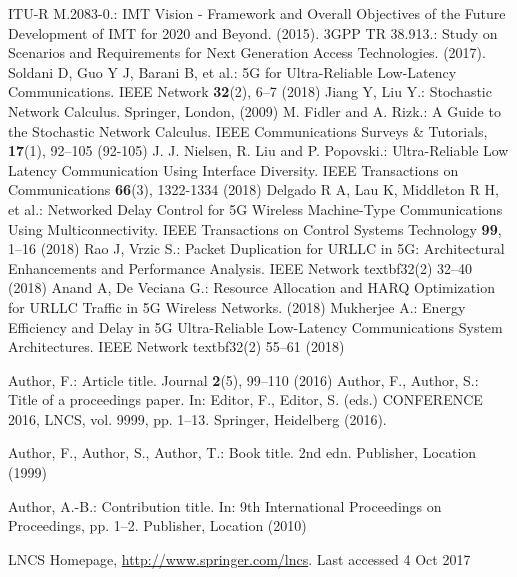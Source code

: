 \documentclass[runningheads]{llncs}
\begin{document}
\begin{thebibliography}{8}
ITU-R M.2083-0.: IMT Vision - Framework and Overall Objectives of the Future Development of IMT for 2020 and Beyond. (2015).
 3GPP TR 38.913.: Study on Scenarios and Requirements for Next Generation Access Technologies. (2017).
Soldani D, Guo Y J, Barani B, et al.: 5G for Ultra-Reliable Low-Latency Communications. IEEE Network \textbf{32}(2), 6--7 (2018)
Jiang Y, Liu Y.: Stochastic Network Calculus. Springer, London, (2009)
M. Fidler and A. Rizk.: A Guide to the Stochastic Network Calculus. IEEE Communications Surveys \& Tutorials, \textbf{17}(1), 92--105 (92-105)
J. J. Nielsen, R. Liu and P. Popovski.: Ultra-Reliable Low Latency Communication Using Interface Diversity. IEEE Transactions on Communications \textbf{66}(3), 1322-1334 (2018)
Delgado R A, Lau K, Middleton R H, et al.: Networked Delay Control for 5G Wireless Machine-Type Communications Using Multiconnectivity. IEEE Transactions on Control Systems Technology \textbf{99}, 1--16 (2018)
Rao J, Vrzic S.: Packet Duplication for URLLC in 5G: Architectural Enhancements and Performance Analysis. IEEE Network textbf{32}(2) 32--40 (2018)
Anand A, De Veciana G.: Resource Allocation and HARQ Optimization for URLLC Traffic in 5G Wireless Networks. (2018)
Mukherjee A.: Energy Efficiency and Delay in 5G Ultra-Reliable Low-Latency Communications System Architectures. IEEE Network textbf{32}(2) 55--61 (2018)


Author, F.: Article title. Journal \textbf{2}(5), 99--110 (2016)
Author, F., Author, S.: Title of a proceedings paper. In: Editor,
F., Editor, S. (eds.) CONFERENCE 2016, LNCS, vol. 9999, pp. 1--13.
Springer, Heidelberg (2016). 

Author, F., Author, S., Author, T.: Book title. 2nd edn. Publisher,
Location (1999)

Author, A.-B.: Contribution title. In: 9th International Proceedings
on Proceedings, pp. 1--2. Publisher, Location (2010)

LNCS Homepage, \url{http://www.springer.com/lncs}. Last accessed 4
Oct 2017
\end{thebibliography}
\end{document}
